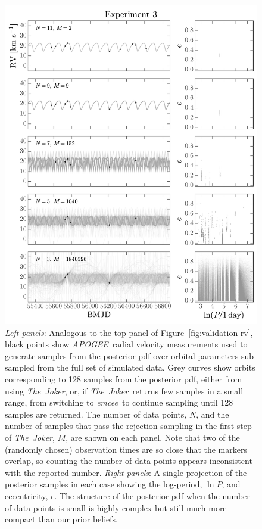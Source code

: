 \documentclass[manuscript, letterpaper]{aastex6}
\newcommand{\project}[1]{\textsl{#1}}
\newcommand{\acronym}[1]{{\small{#1}}}
\newcommand{\apogee}{\project{\acronym{APOGEE}}}
\newcommand{\samplername}{\project{The~Joker}}
\newcommand{\emcee}{\project{emcee}}
\newcommand{\figname}{Figure}
\begin{document}
\begin{figure}[p]
\begin{center}
\includegraphics[width=\textwidth]{figures/numpts-rv-curves.pdf}
\end{center}
\caption{%
{\sl Left panels}: Analogous to the top panel of \figname~\ref{fig:validation-rv}, black
points show \apogee\ radial velocity measurements used to generate samples from
the posterior pdf over orbital parameters sub-sampled from the full set of
simulated data.
Grey curves show orbits corresponding to 128 samples from the posterior pdf, either
from using \samplername, or, if \samplername\ returns few samples in a small
range, from switching to \emcee\ to continue sampling until 128 samples are
returned.
The number of data points, $N$, and the number of samples that pass the
rejection sampling in the first step of \samplername, $M$, are shown on each
panel.
Note that two of the (randomly chosen) observation times are so close that the
markers overlap, so counting the number of data points appears inconsistent with
the reported number.
{\sl Right panels}: A single projection of the posterior samples in each case
showing the log-period, $\ln P$, and eccentricity, $e$.
The structure of the posterior pdf when the number of data points is small is
highly complex but still much more compact than our prior beliefs.
\label{fig:numpts-rv}}
\end{figure}
\end{document}
